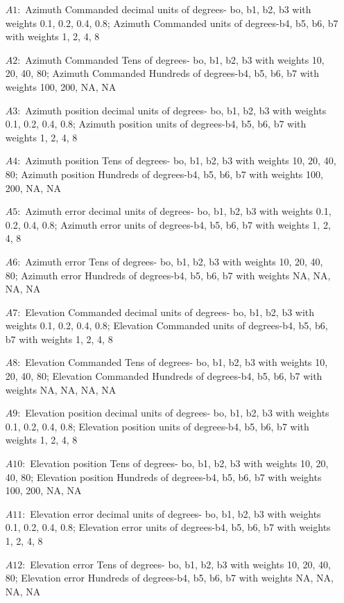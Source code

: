 \begin{enumerate}
	\item [$A1:$] Azimuth Commanded decimal units of degrees- bo, b1, b2, b3 with weights 0.1, 0.2, 0.4, 0.8; Azimuth Commanded units of degrees-b4, b5, b6, b7 with weights 1, 2, 4, 8
	\item [$A2:$] Azimuth Commanded Tens of degrees- bo, b1, b2, b3 with weights 10, 20, 40, 80; Azimuth Commanded Hundreds of degrees-b4, b5, b6, b7 with weights 100, 200, NA, NA
	\item [$A3:$] Azimuth position decimal units of degrees- bo, b1, b2, b3 with weights 0.1, 0.2, 0.4, 0.8; Azimuth position units of degrees-b4, b5, b6, b7 with weights 1, 2, 4, 8 
	\item [$A4:$] Azimuth position Tens of degrees- bo, b1, b2, b3 with weights 10, 20, 40, 80; Azimuth position Hundreds of degrees-b4, b5, b6, b7 with weights 100, 200, NA, NA
	\item [$A5:$] Azimuth error decimal units of degrees- bo, b1, b2, b3 with weights 0.1, 0.2, 0.4, 0.8; Azimuth error units of degrees-b4, b5, b6, b7 with weights 1, 2, 4, 8 
	\item [$A6:$] Azimuth error Tens of degrees- bo, b1, b2, b3 with weights 10, 20, 40, 80; Azimuth error Hundreds of degrees-b4, b5, b6, b7 with weights NA, NA, NA, NA
	\item [$A7:$] Elevation Commanded decimal units of degrees- bo, b1, b2, b3 with weights 0.1, 0.2, 0.4, 0.8; Elevation Commanded units of degrees-b4, b5, b6, b7 with weights 1, 2, 4, 8 
	\item [$A8:$] Elevation Commanded Tens of degrees- bo, b1, b2, b3 with weights 10, 20, 40, 80; Elevation Commanded Hundreds of degrees-b4, b5, b6, b7 with weights NA, NA, NA, NA 
	\item [$A9:$] Elevation position decimal units of degrees- bo, b1, b2, b3 with weights 0.1, 0.2, 0.4, 0.8; Elevation position units of degrees-b4, b5, b6, b7 with weights 1, 2, 4, 8
	\item [$A10:$] Elevation position Tens of degrees- bo, b1, b2, b3 with weights 10, 20, 40, 80; Elevation position Hundreds of degrees-b4, b5, b6, b7 with weights 100, 200, NA, NA
	\item [$A11:$] Elevation error decimal units of degrees- bo, b1, b2, b3 with weights 0.1, 0.2, 0.4, 0.8; Elevation error units of degrees-b4, b5, b6, b7 with weights 1, 2, 4, 8 
	\item [$A12:$] Elevation error Tens of degrees- bo, b1, b2, b3 with weights 10, 20, 40, 80; Elevation error Hundreds of degrees-b4, b5, b6, b7 with weights NA, NA, NA, NA 
\end{enumerate}
 
